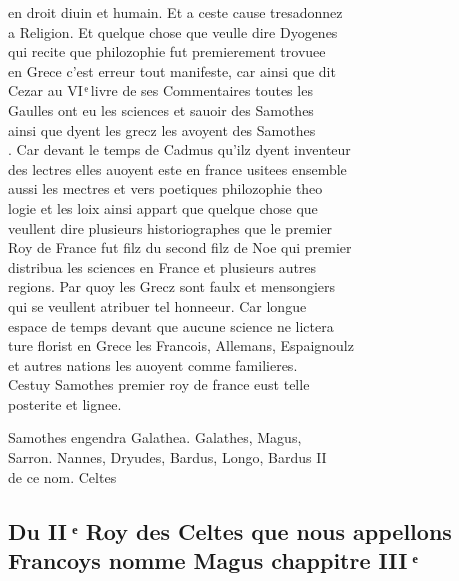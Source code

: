 \documentclass[12pt]{article}
\begin{document}
en droit diuin et humain. Et a ceste cause tresadonnez\\
a Religion.
          Et quelque chose que veulle dire Dyogenes\\
qui recite que philozophie fut premierement trovuee\\
en Grece c'est
          erreur tout manifeste, car ainsi que dit\\
Cezar
          au VI ͤ livre de ses Commentaires toutes
            les\\
Gaulles ont eu les sciences et sauoir des Samothes\\
ainsi que dyent les grecz les avoyent des Samothes\\
. Car devant le temps de Cadmus qu'ilz dyent
            inventeur\\
des lectres elles auoyent este en france usitees ensemble\\
aussi les mectres et vers poetiques philozophie theo\\
logie et les loix ainsi
          appart que quelque chose que\\
veullent dire plusieurs historiographes que le
            premier\\
Roy de France fut filz du second filz de Noe qui premier\\
distribua les sciences en France et plusieurs
            autres\\
regions. Par quoy les Grecz sont faulx et mensongiers\\
qui
          se veullent atribuer tel honneeur. Car longue\\
espace de temps devant que aucune
          science ne lictera\\
ture florist en Grece les Francois, Allemans, Espaignoulz\\
et autres nations les auoyent comme familieres.\\
Cestuy Samothes premier roy de france eust telle\\
posterite et lignee.



Samothes engendra Galathea. Galathes, Magus,\\
Sarron. Nannes,
           Dryudes,
           Bardus,
           Longo,
           Bardus II\\
de ce nom.
          Celtes





\subsection*{Du II ͤ Roy des Celtes que nous appellons\protect\\ Francoys nomme
            Magus chappitre III ͤ}
\end{document}
